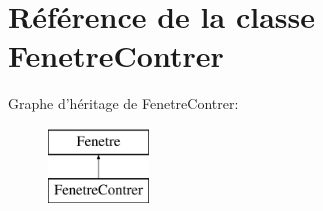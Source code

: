 \hypertarget{classFenetreContrer}{\section{\-Référence de la classe \-Fenetre\-Contrer}
\label{classFenetreContrer}
}
\-Graphe d'héritage de \-Fenetre\-Contrer\-:\begin{figure}[H]
\begin{center}
\leavevmode
\includegraphics[height=2.000000cm]{classFenetreContrer}
\end{center}
\end{figure}
